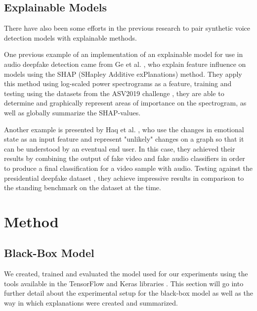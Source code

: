 \documentclass{article}
\begin{document}
	\subsection{Explainable Models}
	There have also been some efforts in the previous research to pair synthetic voice detection
	models with explainable methods.
	\par
	One previous example of an implementation of an explainable model for use in audio deepfake
	detection came from Ge et al. \cite{ge_explaining_2024}, who explain feature influence on
	models using the SHAP (SHapley Additive exPlanations) method. They apply this method using
	log-scaled power spectrograms as a feature, training and testing using the datasets from the
	ASV2019 challenge \cite{wang_asvspoof_2020}, they are able to determine and graphically
	represent areas of importance on the spectrogram, as well as globally summarize the
	SHAP-values.
	\par
	Another example is presented by Haq et al. \cite{haq_multimodal_2023}, who use the changes in
	emotional state as an input feature and represent "unlikely" changes on a graph so that it can
	be understood by an eventual end user. In this case, they achieved their results by combining
	the output of fake video and fake audio classifiers in order to produce a final classification
	for a video sample with audio. Testing against the presidential deepfake dataset
	\cite{sankaranarayanan_presidential_nodate}, they achieve impressive results in comparison to
	the standing benchmark on the dataset at the time.
	\section{Method}
	\label{sec:method}
		\subsection{Black-Box Model}
		We created, trained and evaluated the model used for our experiments using the tools
		available in the TensorFlow and Keras libraries \cite{tensorflow2015-whitepaper}. This
		section will go into further detail about the experimental setup for the black-box model
		as well as the way in which explanations were created and summarized.
\end{document}
